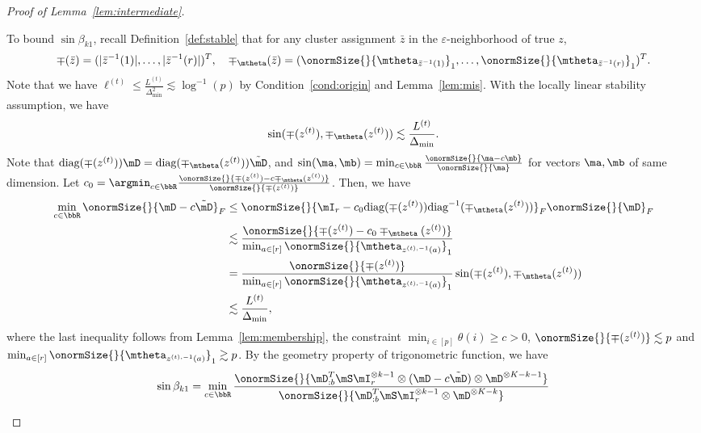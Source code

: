 \documentclass[lettersize,onecolumn,journal]{IEEEtran}
\theoremstyle{definition}
\theoremstyle{definition}
\begin{document}
\begin{proof}[Proof of Lemma~\ref{lem:intermediate}]
\begin{enumerate}[wide]
    To bound $\sin \beta_{k1}$, recall Definition~\ref{def:stable} that for any cluster assignment $\bar z$ in the $\varepsilon$-neighborhood of true $z$,
    \begin{equation}
        \mp(\bar z)=(|\bar z^{-1}(1)|, \ldots,|\bar z^{-1}(r)|)^T,\quad \mp_{\mtheta}(\bar z)=(\onormSize{}{\mtheta_{\bar z^{-1}(1)}}_1,\ldots,\onormSize{}{\mtheta_{\bar z^{-1}(r)}}_1)^T.
    \end{equation}
    Note that we have $\ell^{(t)} \leq \frac{L^{(t)}}{\Delta_{\min}^2} \lesssim \log^{-1}(p) $ by Condition~\ref{cond:origin} and Lemma~\ref{lem:mis}. With the locally linear stability assumption, we have 
    \begin{equation}
         \sin (\mp(z^{(t)}), \mp_{\mtheta}(z^{(t)})) \lesssim \frac{L^{(t)}}{\Delta_{\min}}. 
    \end{equation}
    Note that $\text{diag}(\mp(z^{(t)})) \mD = \text{diag}(\mp_{\mtheta}(z^{(t)})) \tilde \mD$, and $\sin(\ma,\mb) =\min_{c \in \bbR} \frac{ \onormSize{}{\ma - c\mb} }{\onormSize{}{\ma}}$ for vectors $\ma,\mb$ of same dimension. Let $c_0 = \argmin_{c \in \bbR} \frac{\onormSize{}{\mp(z^{(t)}) - c\mp_{\mtheta}(z^{(t)})}}{\onormSize{}{\mp(z^{(t)})}}$. Then, we have
    \begin{align}
       \min_{c \in \bbR} \onormSize{}{ \mD - c \tilde \mD}_F &\leq  \onormSize{}{ \mI_r - c_0 \text{diag}(\mp(z^{(t)})) \text{diag}^{-1}(\mp_{\mtheta}(z^{(t)}))}_F \onormSize{}{\mD}_F\\
       &\lesssim \frac{ \onormSize{}{ \mp(z^{(t)}) - c_0\mp_{\mtheta}(z^{(t)})} }{\min_{a \in [r]} \onormSize{}{\mtheta_{z^{(t),-1}(a)} }_1  } \\
       & = \frac{\onormSize{}{ \mp(z^{(t)})} }{\min_{a \in [r]} \onormSize{}{\mtheta_{z^{(t),-1}(a)} }_1 } \sin (\mp(z^{(t)}), \mp_{\mtheta}(z^{(t)}))\\
       & \lesssim \frac{L^{(t)}}{\Delta_{\min}},
    \end{align}
    where the last inequality follows from Lemma~\ref{lem:membership}, the constraint $\min_{i \in [p]}\theta(i) \geq c>0$, $\onormSize{}{ \mp(z^{(t)})} \lesssim p$ and $\min_{a \in [r]} \onormSize{}{\mtheta_{z^{(t),-1}(a)} }_1  \gtrsim p$. By the geometry property of trigonometric function, we have
    \begin{align}\label{eq:b1}
        \sin \beta_{k1} &= \min_{c \in \bbR} \frac{\onormSize{}{\mD_{:b}^{T} \mS \mI_r^{\otimes k-1} \otimes (\mD - c \tilde \mD) \otimes \mD^{\otimes K-k - 1} } }{ \onormSize{}{\mD_{:b}^{T} \mS \mI_r^{\otimes k-1} \otimes \mD^{\otimes K-k}} }\\

\end{align}
\end{enumerate}
\end{proof}
\end{document}
